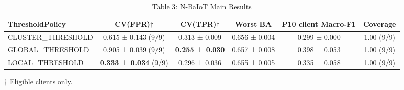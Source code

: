 \begin{table}[htbp]
\caption{Table 3: N-BaIoT Main Results}
\centering
\begin{tabular}{l c c c c c}
\toprule
ThresholdPolicy & CV(FPR)$\dagger$ & CV(TPR)$\dagger$ & Worst BA & P10 client Macro-F1 & Coverage \\
\midrule
CLUSTER_THRESHOLD & 0.615 ± 0.143 (9/9) & 0.313 ± 0.009 & 0.656 ± 0.004 & 0.299 ± 0.000 & 1.00 (9/9) \\
GLOBAL_THRESHOLD & 0.905 ± 0.039 (9/9) & \textbf{0.255 ± 0.030} & 0.657 ± 0.008 & 0.398 ± 0.053 & 1.00 (9/9) \\
LOCAL_THRESHOLD & \textbf{0.333 ± 0.034} (9/9) & 0.296 ± 0.036 & 0.655 ± 0.005 & 0.335 ± 0.058 & 1.00 (9/9) \\
\bottomrule
\end{tabular}

\footnotesize{† Eligible clients only.}
\end{table}